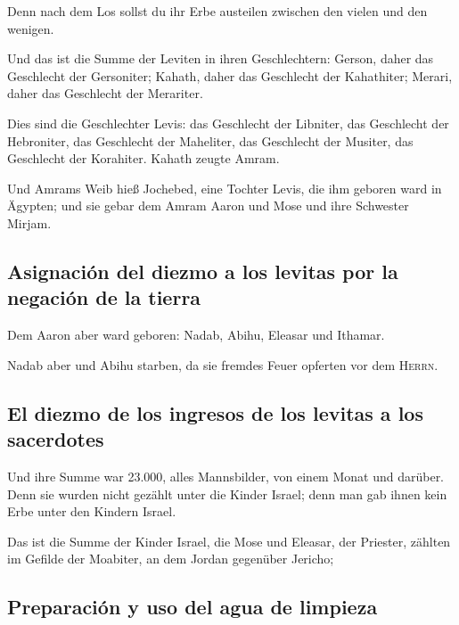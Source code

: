  Denn nach dem Los sollst du ihr Erbe austeilen zwischen
den vielen und den wenigen.

 Und das ist die Summe der Leviten in ihren
Geschlechtern: Gerson, daher das Geschlecht der Gersoniter; Kahath,
daher das Geschlecht der Kahathiter; Merari, daher das Geschlecht der
Merariter.

 Dies sind die Geschlechter Levis: das Geschlecht der
Libniter, das Geschlecht der Hebroniter, das Geschlecht der Maheliter,
das Geschlecht der Musiter, das Geschlecht der Korahiter. Kahath zeugte
Amram.

 Und Amrams Weib hieß Jochebed, eine Tochter Levis, die
ihm geboren ward in Ägypten; und sie gebar dem Amram Aaron und Mose und
ihre Schwester Mirjam.

\hypertarget{asignaciuxf3n-del-diezmo-a-los-levitas-por-la-negaciuxf3n-de-la-tierra}{%
\subsection{Asignación del diezmo a los levitas por la negación de la
tierra}\label{asignaciuxf3n-del-diezmo-a-los-levitas-por-la-negaciuxf3n-de-la-tierra}}

 Dem Aaron aber ward geboren: Nadab, Abihu, Eleasar und
Ithamar.

 Nadab aber und Abihu starben, da sie fremdes Feuer
opferten vor dem \textsc{Herrn}.

\hypertarget{el-diezmo-de-los-ingresos-de-los-levitas-a-los-sacerdotes}{%
\subsection{El diezmo de los ingresos de los levitas a los
sacerdotes}\label{el-diezmo-de-los-ingresos-de-los-levitas-a-los-sacerdotes}}

 Und ihre Summe war 23.000, alles Mannsbilder, von einem
Monat und darüber. Denn sie wurden nicht gezählt unter die Kinder
Israel; denn man gab ihnen kein Erbe unter den Kindern Israel.

 Das ist die Summe der Kinder Israel, die Mose und
Eleasar, der Priester, zählten im Gefilde der Moabiter, an dem Jordan
gegenüber Jericho;

\hypertarget{preparaciuxf3n-y-uso-del-agua-de-limpieza}{%
\subsection{Preparación y uso del agua de
limpieza}\label{preparaciuxf3n-y-uso-del-agua-de-limpieza}}

